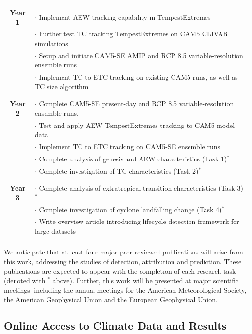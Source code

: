 \documentclass[11pt]{article}
\begin{document}
\begin{tabularx}{\textwidth}{cX}
\hline
\\
\textbf{Year 1} & $\cdot$ Implement AEW tracking capability in TempestExtremes \\
& $\cdot$ Further test TC tracking TempestExtremes on CAM5 CLIVAR simulations \\
& $\cdot$ Setup and initiate CAM5-SE AMIP and RCP 8.5 variable-resolution ensemble runs \\
& $\cdot$ Implement TC to ETC tracking on existing CAM5 runs, as well as TC size algorithm\\ 
\\
\hline
\\
\textbf{Year 2} & $\cdot$ Complete CAM5-SE present-day and RCP 8.5 variable-resolution ensemble runs.  \\
& $\cdot$ Test and apply AEW TempestExtremes tracking to CAM5 model data \\
& $\cdot$ Implement TC to ETC tracking on CAM5-SE ensemble runs\\
& $\cdot$ Complete analysis of genesis and AEW characteristics (Task 1)$^\ast$ \\
& $\cdot$ Complete investigation of TC characteristics (Task 2)$^\ast$ \\
\\
\hline
\\
\textbf{Year 3} & $\cdot$ Complete analysis of extratropical transition characteristics (Task 3)$^\ast$ \\ 
& $\cdot$ Complete investigation of cyclone landfalling change (Task 4)$^\ast$ \\
& $\cdot$ Write overview article introducing lifecycle detection framework for large datasets \\
\\
\hline
\end{tabularx}

We anticipate that at least four major peer-reviewed publications will arise from this work, addressing the studies of detection, attribution and prediction.  These publications are expected to appear with the completion of each research task (denoted with $^\ast$ above). Further, this work will be presented at major scientific meetings, including the annual meetings for the American Meteorological Society, the American Geophysical Union and the European Geophysical Union.

\subsection{Online Access to Climate Data and Results}\label{sec:data access}
\end{document}
